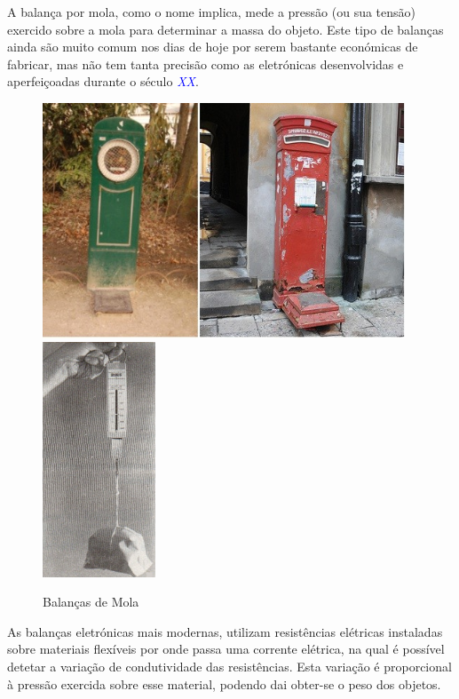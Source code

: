 A balança por mola, como o nome implica, mede a pressão (ou sua tensão) exercido sobre a mola para determinar a massa do objeto. Este tipo de balanças ainda são muito comum nos dias de hoje por serem bastante económicas de fabricar, mas não tem tanta precisão como as eletrónicas desenvolvidas e aperfeiçoadas durante o século \textcolor{blue}{\textit{XX}}.
\newline
\newline
\begin{minipage}[!b]{\linewidth}
	\begin{figure}[H]
		\captionsetup{justification=raggedright,singlelinecheck=false}
		\flushleft
		\includegraphics[height=7cm]{./image/PESTA/general/Public_Body_Scales_1.jpg}
		\hspace{.8cm}
		\includegraphics[height=7cm]{./image/PESTA/general/Balanca_Mola_1.jpg}
		\caption{Balanças de Mola}
		\label{Balanca_Mola_1}
	\end{figure}
\end{minipage}
\newpage
As balanças eletrónicas mais modernas, utilizam resistências elétricas instaladas sobre materiais flexíveis por onde passa uma corrente elétrica, na qual é possível detetar a variação de condutividade das resistências. Esta variação é proporcional à pressão exercida sobre esse material, podendo dai obter-se o peso dos objetos.
